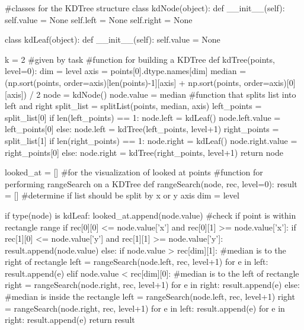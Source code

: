 \documentclass[english, fontsize=12pt, paper=a4, twoside=false, draft=true, pagesize=auto, version=last, DIV=16]{scrartcl}
\theoremstyle{break}
\begin{document}
\begin{python}
#classes for the KDTree structure
class kdNode(object):
    def __init__(self):
        self.value = None
        self.left = None
        self.right = None

class kdLeaf(object):
    def __init__(self):
        self.value = None

k = 2 #given by task
#function for building a KDTree
def kdTree(points, level=0):
    dim = level %
    axis = points[0].dtype.names[dim]
    median = (np.sort(points, order=axis)[len(points)-1][axis] +
            np.sort(points, order=axis)[0][axis]) / 2
    node = kdNode()
    node.value = median
    #function that splits list into left and right
    split_list = splitList(points, median, axis)
    left_points = split_list[0]
    if len(left_points) == 1:
        node.left = kdLeaf()
        node.left.value = left_points[0]
    else:
        node.left = kdTree(left_points, level+1)
    right_points = split_list[1]
    if len(right_points) == 1:
        node.right = kdLeaf()
        node.right.value = right_points[0]
    else:
        node.right = kdTree(right_points, level+1)
    return node
\end{python}

\newpage

\begin{python}
looked_at = [] #for the visualization of looked at points
#function for performing rangeSearch on a KDTree
def rangeSearch(node, rec, level=0):
    result = []
    #determine if list should be split by x or y axis
    dim = level %

    if type(node) is kdLeaf:
        looked_at.append(node.value)
        #check if point is within rectangle range
        if rec[0][0] <= node.value['x'] and rec[0][1] >= node.value['x']:
        if rec[1][0] <= node.value['y'] and rec[1][1] >= node.value['y']:
                result.append(node.value)
    else:
        if node.value > rec[dim][1]:
            #median is to the right of rectangle
            left = rangeSearch(node.left, rec, level+1)
            for e in left:
                result.append(e)
        elif node.value < rec[dim][0]:
            #median is to the left of rectangle
            right = rangeSearch(node.right, rec, level+1)
            for e in right:
                result.append(e)
        else:
            #median is inside the rectangle
            left = rangeSearch(node.left, rec, level+1)
            right = rangeSearch(node.right, rec, level+1)
            for e in left:
                result.append(e)
            for e in right:
                result.append(e)
    return result
\end{python}
\end{document}
